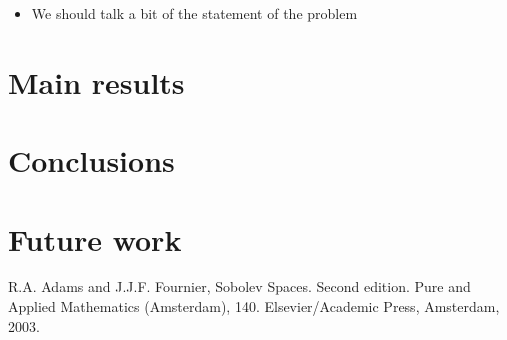 \documentclass[11pt]{article}
\numberwithin{equation}{section}
\numberwithin{figure}{section}
\begin{document}
\begin{itemize}
\item We should talk a bit of the  statement of the problem 
\end{itemize}
\section{Main results}

\section{Conclusions}

\section{Future work}

\begin{thebibliography}{99}

{\sc R.A. Adams and J.J.F. Fournier},
Sobolev Spaces. Second edition. Pure and Applied Mathematics (Amsterdam), 140. 
Elsevier/Academic Press, Amsterdam, 2003. 

 

\end{thebibliography}
\end{document}
